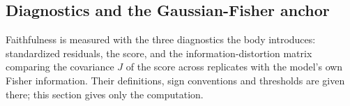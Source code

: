 \subsection*{Diagnostics and the Gaussian-Fisher anchor}

Faithfulness is measured with %
the three diagnostics the body introduces: standardized residuals,
the score, and the information-distortion matrix comparing the covariance $J$ of the score
across replicates with the model's own Fisher information. Their definitions, sign conventions
and thresholds are given there; this section gives only the computation.

